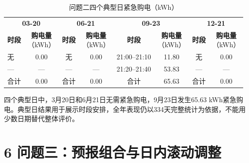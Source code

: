 \documentclass[UTF8,a4paper,zihao=-4,fontset=windows]{ctexart}
\begin{document}
\begin{table}[H]\centering
\fontsize{9.5}{12}\selectfont\setlength{\tabcolsep}{4pt}\renewcommand{\arraystretch}{1.12}
\begin{adjustbox}{max width=\linewidth}\begin{tabular}{lccccccc}\toprule
\multicolumn{2}{c}{\textbf{03-20}} & \multicolumn{2}{c}{\textbf{06-21}} & \multicolumn{2}{c}{\textbf{09-23}} & \multicolumn{2}{c}{\textbf{12-21}}\\
\cmidrule(lr){1-2} \cmidrule(lr){3-4} \cmidrule(lr){5-6} \cmidrule(lr){7-8}
\textbf{时段} & \shortstack{\textbf{购电量}\\{\normalfont （kWh）}} & \textbf{时段} & \shortstack{\textbf{购电量}\\{\normalfont （kWh）}} & \textbf{时段} & \shortstack{\textbf{购电量}\\{\normalfont （kWh）}} & \textbf{时段} & \shortstack{\textbf{购电量}\\{\normalfont （kWh）}}\\\midrule
无 & 0.00 & 无 & 0.00 & 21:00–21:10 & 11.80 & 无 & 0.00\\
— & — & — & — & 21:20–21:40 & 53.83 & — & —\\
合计 & 0.00 & 合计 & 0.00 & 合计 & 65.63 & 合计 & 0.00\\
\bottomrule\end{tabular}\end{adjustbox}
\caption{问题二四个典型日紧急购电（kWh）}
\end{table}
四个典型日中，3月20日和6月21日无需紧急购电，9月23日发生65.63 kWh紧急购电。典型日结果用于展示时段安排，全年表现仍以334天完整统计为依据，不能用少数日期替代整体评价。
\par
\section{6 问题三：预报组合与日内滚动调整}
\end{document}
